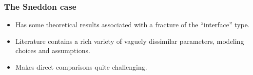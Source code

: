 \documentclass{beamer}
\begin{document}
\begin{frame}
  \frametitle{The Sneddon case}

  \begin{itemize}
  \item Has some theoretical results associated with a fracture of the
    ``interface'' type.
  \item<2-> Literature contains a rich variety of vaguely dissimilar
    parameters, modeling choices and assumptions.
  \item<3-> Makes direct comparisons quite challenging.
  \end{itemize}

\end{frame}
\end{document}
